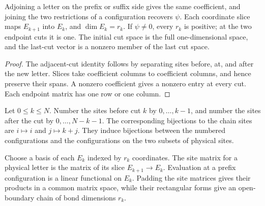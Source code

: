\begin{lemma}
    \label{thm:mpu_minimal_physical_cut_spaces}
    \leanok
    Adjoining a letter on the prefix or suffix side gives the same
    coefficient, and joining the two restrictions of a configuration
    recovers $\psi$. Each coordinate slice maps $E_{k+1}$ into $E_k$,
    and $\dim E_k=r_k$. If $\psi\ne0$, every $r_k$ is positive;
    at the two endpoint cuts it is one. The initial cut space is the
    full one-dimensional space, and the last-cut vector is a nonzero
    member of the last cut space.
\end{lemma}
\begin{proof}\leanok
    The adjacent-cut identity follows by separating sites before,
    at, and after the new letter. Slices take coefficient columns
    to coefficient columns, and hence preserve their spans.
    A nonzero coefficient gives a nonzero entry at every cut.
    Each endpoint matrix has one row or one column.
\end{proof}

\begin{definition}
    \label{def:mpu_physical_cut_numbering}
    \leanok
    Let $0\leq k\leq N$. Number the sites before cut $k$ by
    $0,\ldots,k-1$, and number the sites after the cut by
    $0,\ldots,N-k-1$. The corresponding bijections to the chain
    sites are $i\mapsto i$ and $j\mapsto k+j$. They induce
    bijections between the numbered configurations and the
    configurations on the two subsets of physical sites.
\end{definition}

\begin{definition}
    \label{def:mpu_minimal_cut_coordinate_chain}
    \leanok
    Choose a basis of each $E_k$ indexed by $r_k$ coordinates.
    The site matrix for a physical letter is the matrix of its slice
    $E_{k+1}\to E_k$. Evaluation at a prefix configuration is a
    linear functional on $E_k$. Padding the site matrices gives
    their products in a common matrix space, while their rectangular
    forms give an open-boundary chain of bond dimensions $r_k$.
\end{definition}

